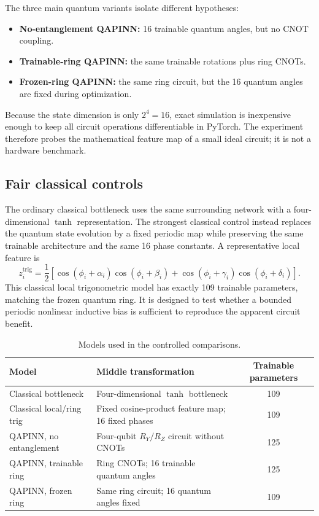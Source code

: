 \documentclass[10pt,a4paper]{article}
\begin{document}
The three main quantum variants isolate different hypotheses:
\begin{itemize}
  \item \textbf{No-entanglement QAPINN:} 16 trainable quantum angles, but no CNOT coupling.
  \item \textbf{Trainable-ring QAPINN:} the same trainable rotations plus ring CNOTs.
  \item \textbf{Frozen-ring QAPINN:} the same ring circuit, but the 16 quantum angles are fixed during optimization.
\end{itemize}
Because the state dimension is only $2^4=16$, exact simulation is inexpensive enough to keep all circuit operations differentiable in PyTorch. The experiment therefore probes the mathematical feature map of a small ideal circuit; it is not a hardware benchmark.

\subsection{Fair classical controls}

The ordinary classical bottleneck uses the same surrounding network with a four-dimensional $\tanh$ representation. The strongest classical control instead replaces the quantum state evolution by a fixed periodic map while preserving the same trainable architecture and the same 16 phase constants. A representative local feature is
\begin{equation}
z_i^{\mathrm{trig}}
=\frac12\left[
\cos(\phi_i+\alpha_i)\cos(\phi_i+\beta_i)
+\cos(\phi_i+\gamma_i)\cos(\phi_i+\delta_i)
\right].
\end{equation}
This classical local trigonometric model has exactly 109 trainable parameters, matching the frozen quantum ring. It is designed to test whether a bounded periodic nonlinear inductive bias is sufficient to reproduce the apparent circuit benefit.

\begin{table}[H]
\centering
\caption{Models used in the controlled comparisons.}
\label{tab:models}
\small
\begin{tabularx}{\textwidth}{>{\raggedright\arraybackslash}X >{\raggedright\arraybackslash}X c}
\toprule
\textbf{Model} & \textbf{Middle transformation} & \textbf{Trainable parameters}\\
\midrule
Classical bottleneck & Four-dimensional $\tanh$ bottleneck & 109\\
Classical local/ring trig & Fixed cosine-product feature map; 16 fixed phases & 109\\
QAPINN, no entanglement & Four-qubit $R_Y/R_Z$ circuit without CNOTs & 125\\
QAPINN, trainable ring & Ring CNOTs; 16 trainable quantum angles & 125\\
QAPINN, frozen ring & Same ring circuit; 16 quantum angles fixed & 109\\
\bottomrule
\end{tabularx}
\end{table}
\end{document}
